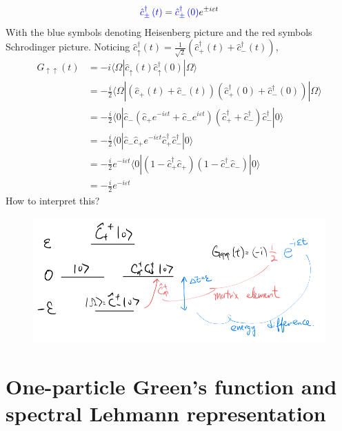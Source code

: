 \[ {\color{blue} \hat{c}_{\pm}^{\dagger}\left( t \right) }={\color{blue} \hat{c}_{\pm}^{\dagger}\left( 0 \right) }e^{\pm i\varepsilon t}\]
With the blue symbols denoting Heisenberg picture and the red symbols Schrodinger picture. Noticing $\hat{c}_{\uparrow}^{\dagger}\left( t \right) =\frac{1}{\sqrt{2}}\left( \hat{c}_{+}^{\dagger}\left( t \right) +\hat{c}_{-}^{\dagger}\left( t \right) \right)$,
\begin{align*}
    G_{\uparrow \uparrow}\left( t \right) &=-i\langle \Omega |\hat{c}_{\uparrow}\left( t \right) \hat{c}_{\uparrow}^{\dagger}\left( 0 \right) |\Omega \rangle \\
    &=-\frac{i}{2}\langle \Omega |\left( \hat{c}_+\left( t \right) +\hat{c}_-\left( t \right) \right) \left( \hat{c}_{+}^{\dagger}\left( 0 \right) +\hat{c}_{-}^{\dagger}\left( 0 \right) \right) |\Omega \rangle \\
    &=-\frac{i}{2}\langle 0|\hat{c}_-\left( \hat{c}_+e^{-i\varepsilon t}+\hat{c}_-e^{i\varepsilon t} \right) \left( \hat{c}_{+}^{\dagger}+\hat{c}_{-}^{\dagger} \right) \hat{c}_{-}^{\dagger}|0\rangle \\
    &=-\frac{i}{2}\langle 0|\hat{c}_-\hat{c}_+e^{-i\varepsilon t}\hat{c}_{+}^{\dagger}\hat{c}_{-}^{\dagger}|0\rangle \\
    &=-\frac{i}{2}e^{-i\varepsilon t}\langle 0|\left( 1-\hat{c}_{+}^{\dagger}\hat{c}_+ \right) \left( 1-\hat{c}_{-}^{\dagger}\hat{c}_- \right) |0\rangle \\
    &=-\frac{i}{2}e^{-i\varepsilon t}
\end{align*}
How to interpret this?
\begin{figure}[h]
    \centering
    \includegraphics[width=\textwidth]{jupyterbook/data/fig/lec04-fig02.png}
\end{figure}

\section{One-particle Green's function and spectral Lehmann representation}


